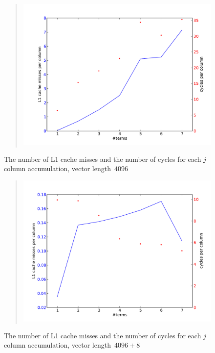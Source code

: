 \begin{figure}
  \begin{quote}
  \includegraphics[scale=.5]{graphics-public/l1_assoc}
  \end{quote}
  \caption{The number of L1 cache misses and the number of cycles for
    each $j$ column accumulation, vector length~$4096$}
  \label{fig:l1_assoc}
\end{figure}

\begin{figure}
  \begin{quote}
  \includegraphics[scale=.5]{graphics-public/l1_assocshift}
  \end{quote}
  \caption{The number of L1 cache misses and the number of cycles for
    each $j$ column accumulation, vector length~$4096+8$}
  \label{fig:l1_assoc_shift}
\end{figure}

